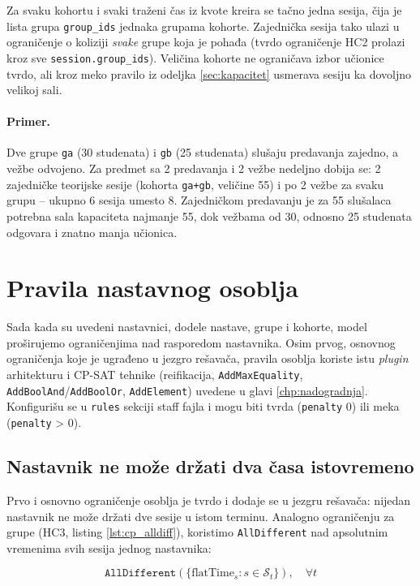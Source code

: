 \documentclass[12pt,oneside]{memoir}
\begin{document}
Za svaku kohortu i svaki traženi čas iz kvote kreira se tačno jedna
sesija, čija je lista grupa \texttt{group\_ids} jednaka grupama kohorte.
Zajednička sesija tako ulazi u ograničenje o koliziji \emph{svake} grupe
koja je pohađa (tvrdo ograničenje HC2 prolazi kroz sve
\texttt{session.group\_ids}). Veličina kohorte ne ograničava izbor
učionice tvrdo, ali kroz meko pravilo iz odeljka \ref{sec:kapacitet}
usmerava sesiju ka dovoljno velikoj sali.

\paragraph{Primer.} Dve grupe \texttt{ga} (30 studenata) i \texttt{gb}
(25 studenata) slušaju predavanja zajedno, a vežbe odvojeno. Za predmet
sa 2 predavanja i 2 vežbe nedeljno dobija se: 2 zajedničke teorijske
sesije (kohorta \texttt{ga+gb}, veličine 55) i po 2 vežbe za svaku grupu
-- ukupno 6 sesija umesto 8. Zajedničkom predavanju je za 55 slušalaca
potrebna sala kapaciteta najmanje 55, dok vežbama od 30, odnosno 25
studenata odgovara i znatno manja učionica.

\section{Pravila nastavnog osoblja}
\label{sec:staff_rules}

Sada kada su uvedeni nastavnici, dodele nastave, grupe i kohorte, model
proširujemo ograničenjima nad rasporedom nastavnika. Osim prvog,
osnovnog ograničenja koje je ugrađeno u jezgro rešavača, pravila osoblja
koriste istu \emph{plugin} arhitekturu i CP-SAT tehnike
(reifikacija, \texttt{AddMaxEquality}, \texttt{AddBoolAnd}/\texttt{AddBoolOr},
\texttt{AddElement}) uvedene u glavi \ref{chp:nadogradnja}. Konfigurišu
se u \texttt{rules} sekciji staff fajla i mogu biti tvrda
(\texttt{penalty} 0) ili meka (\texttt{penalty} > 0).

\subsection{Nastavnik ne može držati dva časa istovremeno}

Prvo i osnovno ograničenje osoblja je tvrdo i dodaje se u jezgru
rešavača: nijedan nastavnik ne može držati dve sesije u istom terminu.
Analogno ograničenju za grupe (HC3, listing \ref{lst:cp_alldiff}),
koristimo \texttt{AllDifferent} nad apsolutnim vremenima svih sesija
jednog nastavnika:

\begin{equation}
\texttt{AllDifferent}(\{\text{flatTime}_s : s \in \mathcal{S}_t\}),
  \quad \forall t
\label{eq:staff_nodouble}
\end{equation}
\end{document}
